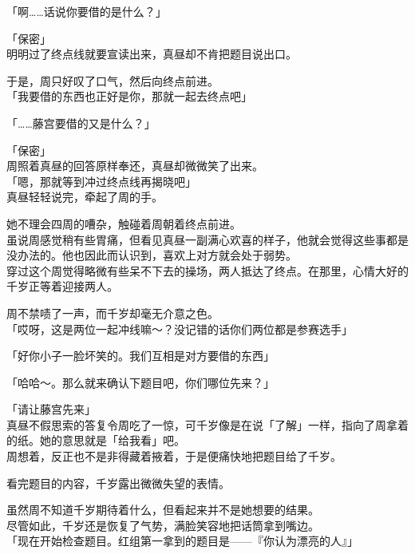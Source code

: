 「啊……话说你要借的是什么？」

「保密」\\

明明过了终点线就要宣读出来，真昼却不肯把题目说出口。

于是，周只好叹了口气，然后向终点前进。\\

「我要借的东西也正好是你，那就一起去终点吧」

「……藤宫要借的又是什么？」

「保密」\\

周照着真昼的回答原样奉还，真昼却微微笑了出来。\\

「嗯，那就等到冲过终点线再揭晓吧」\\

真昼轻轻说完，牵起了周的手。

她不理会四周的嘈杂，触碰着周朝着终点前进。\\

虽说周感觉稍有些胃痛，但看见真昼一副满心欢喜的样子，他就会觉得这些事都是没办法的。他也因此而认识到，喜欢上对方就会处于弱势。\\

穿过这个周觉得略微有些呆不下去的操场，两人抵达了终点。在那里，心情大好的千岁正等着迎接两人。

周不禁啧了一声，而千岁却毫无介意之色。\\

「哎呀，这是两位一起冲线嘛～？没记错的话你们两位都是参赛选手」

「好你小子一脸坏笑的。我们互相是对方要借的东西」

「哈哈～。那么就来确认下题目吧，你们哪位先来？」

「请让藤宫先来」\\

真昼不假思索的答复令周吃了一惊，可千岁像是在说「了解」一样，指向了周拿着的纸。她的意思就是「给我看」吧。\\

周想着，反正也不是非得藏着掖着，于是便痛快地把题目给了千岁。

看完题目的内容，千岁露出微微失望的表情。

虽然周不知道千岁期待着什么，但看起来并不是她想要的结果。\\

尽管如此，千岁还是恢复了气势，满脸笑容地把话筒拿到嘴边。\\

「现在开始检查题目。红组第一拿到的题目是——『你认为漂亮的人』」\\

